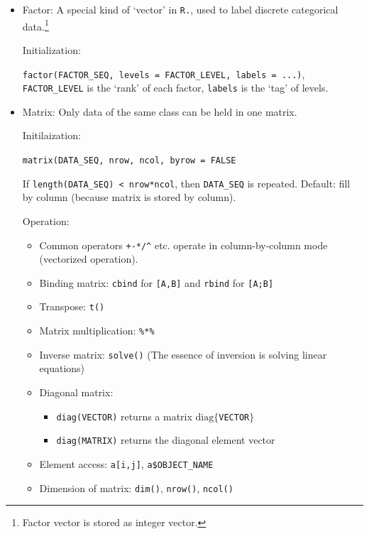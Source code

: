 \begin{itemize}[topsep=2pt,itemsep=0pt]
         

    \item Factor: A special kind of `vector' in \lstinline|R.|, used to label discrete categorical data.\footnote{Factor vector is stored as integer vector.}
    
    Initialization:

    \lstinline|factor(FACTOR_SEQ, levels = FACTOR_LEVEL, labels = ...)|, \lstinline|FACTOR_LEVEL| is the `rank' of each factor, \lstinline|labels| is the `tag' of levels. 

    \item Matrix: Only data of the same class can be held in one matrix.
    
    Initilaization:
    
    \lstinline|matrix(DATA_SEQ, nrow, ncol, byrow = FALSE|
    
    If \lstinline|length(DATA_SEQ) < nrow*ncol|, then \lstinline|DATA_SEQ| is repeated. Default: fill by column (because matrix is stored by column).

    Operation:
    \begin{itemize}[topsep=2pt,itemsep=0pt]
        \item Common operators \lstinline|+-*/^| etc. operate in column-by-column mode (vectorized operation).
        \item Binding matrix: \lstinline|cbind| for \lstinline|[A,B]| and \lstinline|rbind| for \lstinline|[A;B]|
        \item Transpose: \lstinline|t()|
        \item Matrix multiplication: \lstinline|%*%|
        \item Inverse matrix: \lstinline|solve()| (The essence of inversion is solving linear equations)
        \item Diagonal matrix:
        \begin{itemize}[topsep=2pt,itemsep=0pt]
            \item \lstinline|diag(VECTOR)| returns a matrix $ \mathrm{diag}\{ $\lstinline|VECTOR|$ \} $
            \item \lstinline|diag(MATRIX)| returns the diagonal element vector
        \end{itemize}
        \item Element access: \lstinline|a[i,j]|, \lstinline|a$OBJECT_NAME|
        \item Dimension of matrix: \lstinline|dim()|, \lstinline|nrow()|, \lstinline|ncol()|
    \end{itemize}
    

\end{itemize}
